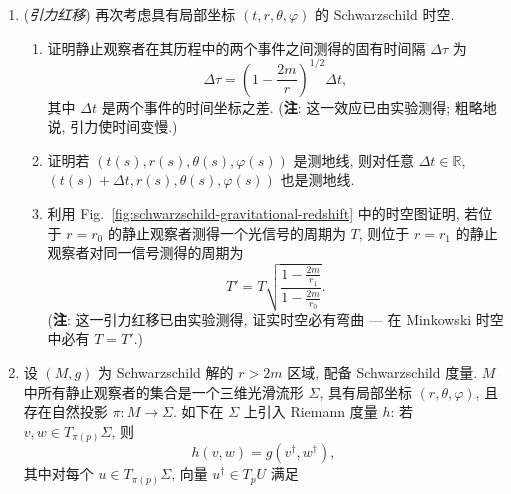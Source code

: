 \begin{RiemannExercise}
\begin{enumerate}[label=(\arabic*),ref=\arabic*,leftmargin=*]
\begin{enumerate}[label=(\alph*),leftmargin=*]
\[\begin{cases}
    \ddot\varphi=0\\
    r\dot\varphi^2=\dfrac{m}{r^2}\dot t^2\\[.5ex]
    \left(1-\dfrac{3m}{r}\right)\dot t^2=1
  \end{cases}.
\]
由此推出, 对任意 $r>3m$, 有质量粒子都可沿圆形轨道绕中心质量运动.
\item 证明对 $r=3m$ 存在一条赤道圆形零模测地线. 位于 $r=3m$, $\theta=\frac{\pi}{2}$ 的静止观察者沿这条零模测地线的方向看, 会看到什么?
\item 自由下落的自旋粒子的角动量向量沿其运动平行移动, 且与其运动正交 [参见 Exercise~\ref{ex:general-relativity}(\ref{ex:fermi-walker-transport})]. 考虑沿圆形轨道绕点状质量 $m$ 运动的自旋粒子. 证明若角动量向量初始沿径向, 则绕行一周后它进动的角度为
\[
  \delta=2\pi\left(1-\left(1-\frac{3m}{r}\right)^{1/2}\right).
\]
(\textbf{注}: Gravity Probe B 实验期间, 人们在绕地球运行的自旋石英球上观测到了上述进动, 称为\textbf{测地进动}.)
\end{enumerate}
\item\label{ex:gravitational-redshift-in-schwarzschild}
(\emph{引力红移}) 再次考虑具有局部坐标 $(t,r,\theta,\varphi)$ 的 Schwarzschild 时空.
\begin{enumerate}[label=(\alph*),leftmargin=*]
\item 证明静止观察者在其历程中的两个事件之间测得的固有时间隔 $\Delta\tau$ 为
\[
  \Delta\tau=\left(1-\frac{2m}{r}\right)^{1/2}\Delta t,
\]
其中 $\Delta t$ 是两个事件的时间坐标之差. (\textbf{注}: 这一效应已由实验测得; 粗略地说, 引力使时间变慢.)
\item 证明若 $(t(s),r(s),\theta(s),\varphi(s))$ 是测地线, 则对任意 $\Delta t\in\mathbb{R}$, $(t(s)+\Delta t,r(s),\theta(s),\varphi(s))$ 也是测地线.
\item 利用 Fig.~\ref{fig:schwarzschild-gravitational-redshift} 中的时空图证明, 若位于 $r=r_0$ 的静止观察者测得一个光信号的周期为 $T$, 则位于 $r=r_1$ 的静止观察者对同一信号测得的周期为
\[
  T'=T\sqrt{\frac{1-\frac{2m}{r_1}}{1-\frac{2m}{r_0}}}.
\]
(\textbf{注}: 这一引力红移已由实验测得, 证实时空必有弯曲 --- 在 Minkowski 时空中必有 $T=T'$.)
\end{enumerate}
\item\label{ex:spatial-geometry-of-schwarzschild-observers}
设 $(M,g)$ 为 Schwarzschild 解的 $r>2m$ 区域, 配备 Schwarzschild 度量. $M$ 中所有静止观察者的集合是一个三维光滑流形 $\Sigma$, 具有局部坐标 $(r,\theta,\varphi)$, 且存在自然投影 $\pi:M\to\Sigma$. 如下在 $\Sigma$ 上引入 Riemann 度量 $h$: 若 $v,w\in T_{\pi(p)}\Sigma$, 则
\[
  h(v,w)=g(v^\dagger,w^\dagger),
\]
其中对每个 $u\in T_{\pi(p)}\Sigma$, 向量 $u^\dagger\in T_pU$ 满足

\end{enumerate}
\end{RiemannExercise}
